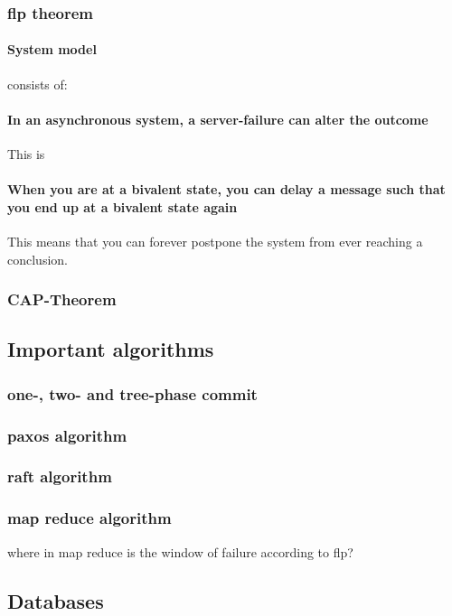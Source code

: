 \subsubsection{flp theorem}

\paragraph{System model} consists of:
\paragraph{In an asynchronous system, a server-failure can alter the outcome} This is
\paragraph{When you are at a bivalent state, you can delay a message such that you end up at a bivalent state again} This means that you can forever postpone the system from ever reaching a conclusion. 

\subsubsection{CAP-Theorem}


\subsection{Important algorithms}

\subsubsection{one-, two- and tree-phase commit}

\subsubsection{paxos algorithm}

\subsubsection{raft algorithm}

\subsubsection{map reduce algorithm}
where in map reduce is the window of failure according to flp?


\subsection{Databases}

